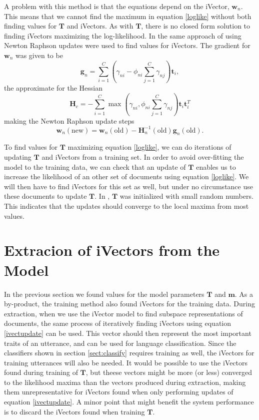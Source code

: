 A problem with this method is that the equations depend on the iVector, $\mathbf{w}_n$. This means that we cannot find the maximum in equation \ref{loglike} without both finding values for $\mathbf{T}$ and iVectors. As with $\mathbf{T}$, there is no closed form solution to finding iVectors maximizing the log-likelihood. In \cite{srivector} the same approach of using Newton Raphson updates were used to find values for iVectors. The gradient for $\mathbf{w}_n$ was given to be
\begin{equation}
\label{ivectgrad}
\mathbf{g}_n = \sum_{i=1}^C \left(\gamma_{ni}-\phi_{ni}\sum_{j=1}^C \gamma_{nj}\right)\mathbf{t}_i,
\end{equation}
the approximate for the Hessian
\begin{equation}
\label{ivecthessian}
\mathbf{H}_c = -\sum_{i=1}^C \max\left(\gamma_{ni}, \phi_{ni}\sum_{j=1}^C \gamma_{nj}\right)\mathbf{t}_i \mathbf{t}_i^T
\end{equation}
making the Newton Raphson update steps
\begin{equation}
\label{ivectupdate}
\mathbf{w}_n(\text{new}) = \mathbf{w}_n(\text{old})-\mathbf{H}_n^{-1}(\text{old})\mathbf{g}_n(\text{old}).
\end{equation}

To find values for $\mathbf{T}$ maximizing equation \ref{loglike}, we can do iterations of updating $\mathbf{T}$ and iVectors from a training set. In order to avoid over-fitting the model to the training data, we can check that an update of $\mathbf{T}$ enables us to increase the likelihood of an other set of documents using equation \ref{loglike}. We will then have to find iVectors for this set as well, but under no circumstance use these documents to update $\mathbf{T}$. In \cite{lrivector}, $\mathbf{T}$ was initialized with small random numbers. This indicates that the updates should converge to the local maxima from most values. 

\section{Extracion of iVectors from the Model}

In the previous section we found values for the model parameters $\mathbf{T}$ and $\mathbf{m}$. As a by-product, the training method also found iVectors for the training data. During extraction, when we use the iVector model to find subspace representations of documents, the same process of iteratively finding iVectors using equation \ref{ivectupdate} can be used. This vector should then represent the most important traits of an utterance, and can be used for language classification. Since the classifiers shown in section \ref{sect:classify} requires training as well, the iVectors for training utterances will also be needed. It would be possible to use the iVectors found during training of $\mathbf{T}$, but theese vectors might be more (or less) converged to the likelihood maxima than the vectors produced during extraction, making them unrepresentative for iVectors found when only performing updates of equation \ref{ivectupdate}.  A minor point that might benefit the system performance is to discard the iVectors found when training $\mathbf{T}$.


